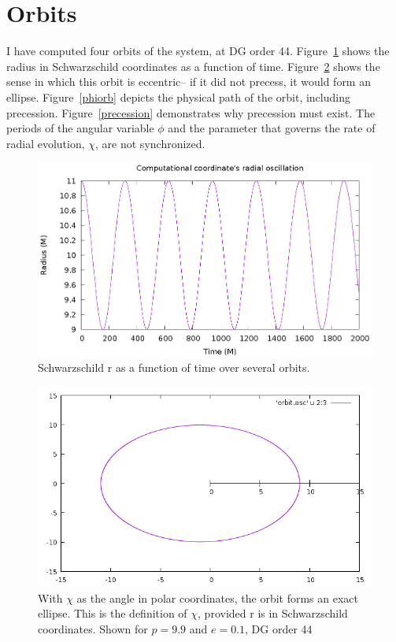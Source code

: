 \section{Orbits}

I have computed four orbits of the system, at DG order 44. Figure~\ref{rorb} shows the radius in Schwarzschild coordinates as a function of time. Figure~\ref{chiorb} shows the sense in which this orbit is eccentric-- if it did not precess, it would form an ellipse. Figure~\ref{phiorb} depicts the physical path of the orbit, including precession. Figure~\ref{precession} demonstrates why precession must exist. The periods of the angular variable $\phi$ and the parameter that governs the rate of radial evolution, $\chi$, are not synchronized.

\begin{figure}
  \includegraphics{orbit}
  \caption{Schwarzschild r as a function of time over several orbits.}
  \label{rorb}
\end{figure}


\begin{figure}
  \includegraphics{orbitdg44p99e01}
  \caption{With $\chi$ as the angle in polar coordinates, the orbit forms an exact ellipse. This is the definition of $\chi$, provided r is in Schwarzschild coordinates. Shown for $p=9.9$ and $e=0.1$, DG order 44}
  \label{chiorb}
\end{figure}

